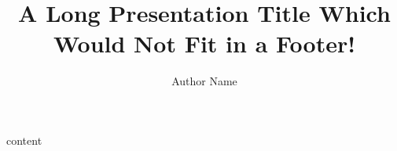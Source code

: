 \documentclass{ltx-talk}
\author{Author Name}
\title[short-title = {Presentation title}]
  {A Long Presentation Title Which Would Not Fit in a Footer!}
\institute{Interesting Conference}
\begin{document}
\begin{frame}
  \maketitle[frame-style = wallpaper]
\end{frame}

\begin{frame}
  content
\end{frame}
\end{document}
